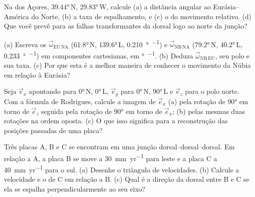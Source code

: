 \begin{exercise}[$\star\star$]\label{exo:b1:plate-kinematics:6}
Na  dos Açores, \ang{39.44}\,N, \ang{29.83}\,W, calcule (a) a distância angular ao  Eurásia--América do Norte, (b) a taxa de espalhamento,
e (c) o  do movimento relativo. (d) Que  você prevê para as falhas transformantes da dorsal logo ao norte da junção?
\end{exercise}

\begin{exercise}[$\star\star$]\label{exo:b1:plate-kinematics:7}
(a) Escreva os  $\vec\omega_{\mathrm{EU\,NA}}$ (\ang{61.8}\,N,
\ang{139.6}\,L, \qty{0.210}{\degree\per\Myr}) e $\vec\omega_{\mathrm{NB\,NA}}$
(\ang{79.2}\,N, \ang{40.2}\,L, \qty{0.233}{\degree\per\Myr}) em componentes cartesianas, em \unit{\degree\per\Myr}. (b) Deduza $\vec\omega_{\mathrm{NB\,EU}}$,
seu polo e sua taxa. (c) Por que esta é a melhor maneira de conhecer o movimento da Núbia em relação à Eurásia?
\end{exercise}

\begin{exercise}[$\star\star$]\label{exo:b1:plate-kinematics:8}
Seja $\vec e_x$ apontando para \ang{0}\,N, \ang{0}\,L, $\vec e_y$ para \ang{0}\,N,
\ang{90}\,L e $\vec e_z$ para o polo norte. Com a fórmula de Rodrigues, calcule
a imagem de $\vec e_x$ (a) pela rotação de \ang{90} em torno de $\vec e_z$
seguida pela rotação de \ang{90} em torno de $\vec e_x$; (b) pelas mesmas duas
rotações na ordem oposta. (c) O que isso significa para a reconstrução das posições passadas de uma placa?
\end{exercise}

\begin{exercise}[$\star\star$]\label{exo:b1:plate-kinematics:9}
Três placas A, B e C se encontram em uma junção dorsal--dorsal--dorsal. Em relação a A,
a placa B se move a \qty{30}{mm.yr^{-1}} para leste e a placa C a
\qty{40}{mm.yr^{-1}} para o sul. (a) Desenhe o triângulo de velocidades.
(b) Calcule a velocidade e o  de C em relação a B. (c) Qual é a direção da
dorsal entre B e C se ela se espalha perpendicularmente ao seu eixo?
\end{exercise}

